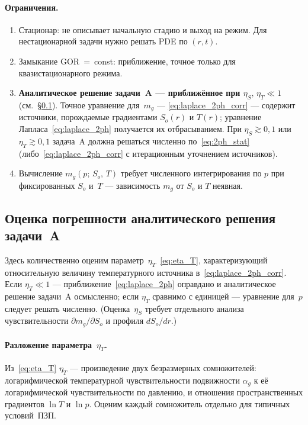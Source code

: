 ﻿\documentclass[12pt,a4paper]{article}
\begin{document}
\paragraph{Ограничения.}
\begin{enumerate}[nosep]
  \item Стационар: не описывает начальную стадию
        и выход на режим. Для нестационарной задачи
        нужно решать PDE по $(r,t)$.
  \item Замыкание GOR~=~const: приближение,
        точное только для квазистационарного режима.
  \item \textbf{Аналитическое решение задачи~A ---
        приближённое при $\eta_S,\,\eta_T \ll 1$}
        (см.~\S\ref{ssec:stat_error}). Точное уравнение
        для~$m_g$ --- \eqref{eq:laplace_2ph_corr} ---
        содержит источники, порождаемые градиентами
        $S_o(r)$ и $T(r)$; уравнение
        Лапласа~\eqref{eq:laplace_2ph} получается их
        отбрасыванием. При $\eta_S \gtrsim 0{,}1$
        или $\eta_T \gtrsim 0{,}1$ задача~A должна
        решаться численно по~\eqref{eq:2ph_stat}
        (либо~\eqref{eq:laplace_2ph_corr} с итерационным
        уточнением источников).
  \item Вычисление $m_g(p;\,S_o,\,T)$ требует численного
        интегрирования по $p$ при фиксированных $S_o$
        и~$T$ --- зависимость $m_g$ от $S_o$ и $T$
        неявная.
\end{enumerate}

\subsection{Оценка погрешности аналитического решения
задачи~A}\label{ssec:stat_error}

Здесь количественно оценим параметр~$\eta_T$~\eqref{eq:eta_T},
характеризующий относительную величину температурного
источника в~\eqref{eq:laplace_2ph_corr}. Если
$\eta_T \ll 1$ --- приближение~\eqref{eq:laplace_2ph}
оправдано и аналитическое решение задачи~A осмысленно;
если $\eta_T$ сравнимо с единицей --- уравнение
для~$p$ следует решать численно. (Оценка~$\eta_S$
требует отдельного анализа чувствительности
$\partial m_g/\partial S_o$ и профиля $dS_o/dr$.)

\paragraph{Разложение параметра~$\eta_T$.}
Из~\eqref{eq:eta_T} $\eta_T$ --- произведение двух
безразмерных сомножителей: логарифмической
температурной чувствительности подвижности $\alpha_g$
к её логарифмической чувствительности по давлению,
и отношения пространственных градиентов $\ln T$ и $\ln p$.
Оценим каждый сомножитель отдельно для типичных условий~ПЗП.
\end{document}
